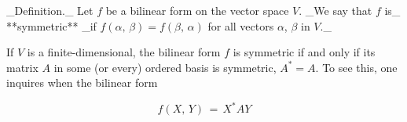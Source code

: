 _Definition._ Let \(f\) be a bilinear form on the vector space \(V\). _We say that \(f\) is_ **symmetric** _if \(f(\alpha,\,\beta)=f(\beta,\,\alpha)\) for all vectors \(\alpha\), \(\beta\) in \(V\)._

If \(V\) is a finite-dimensional, the bilinear form \(f\) is symmetric if and only if its matrix \(A\) in some (or every) ordered basis is symmetric, \(A^{*}=A\). To see this, one inquires when the bilinear form

\[f(X,\,Y)\,=\,X^{*}AY\]
